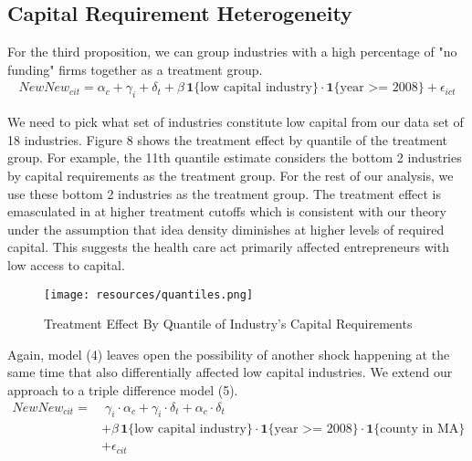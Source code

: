 \documentclass[12pt]{article}
\begin{document}
\subsection{Capital Requirement Heterogeneity}

For the third proposition, we can group industries with a high percentage of "no funding" firms together as a treatment group. 
\begin{align}
NewNew_{cit} =  \alpha_c + \gamma_i+ \delta_t + \beta \, \mathbf{1}\{\text{low capital industry}\} \cdot \mathbf{1}\{\text{year >= 2008}\} + \epsilon_{ict}
\end{align}

We need to pick what set of industries constitute low capital from our data set of 18 industries. Figure 8 shows the treatment effect by quantile of the treatment group. For example, the 11th quantile estimate considers the bottom 2 industries by capital requirements as the treatment group. For the rest of our analysis, we use these bottom 2 industries as the treatment group. The treatment effect is emasculated in at higher treatment cutoffs which is consistent with our theory under the assumption that idea density diminishes at higher levels of required capital. This suggests the health care act primarily affected entrepreneurs with low access to capital. 

\begin{figure}[H]
	\centering
	\texttt{[image: resources/quantiles.png]}
	\caption{Treatment Effect By Quantile of Industry's Capital Requirements}
\end{figure}


\begin{comment}

\begin{figure}[H]
	\centering
	\begin{subfigure}[b]{0.495\textwidth}
		\texttt{[image: resources/quantiles.png]}
		\caption{Model (4)}
	\end{subfigure}
	\begin{subfigure}[b]{0.495\textwidth}
		\texttt{[image: resources/quantiles\_ddd.png]}
		\caption{Model (5)}
	\end{subfigure}
	\caption{Treatment Effect By Quantile of Industry's Capital Requirements}
\end{figure}

\end{comment}

Again, model (4) leaves open the possibility of another shock happening at the same time that also differentially affected low capital industries. We extend our approach to a triple difference model (5). 
\begin{align}
NewNew_{cit} = & \; \gamma_i \cdot \alpha_c + \gamma_i \cdot \delta_t +  \alpha_c \cdot \delta_t \nonumber   \\
& + \beta \, \mathbf{1}\{\text{low capital industry}\} \cdot \mathbf{1}\{\text{year >= 2008}\}  \cdot \mathbf{1}\{\text{county in MA}\} \nonumber  \\
& + \epsilon_{cit}
\end{align}
\end{document}
